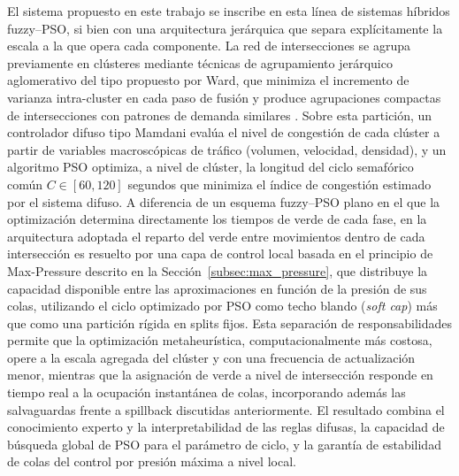 El sistema propuesto en este trabajo se inscribe en esta línea de sistemas híbridos fuzzy--PSO, si bien con una arquitectura jerárquica que separa explícitamente la escala a la que opera cada componente. La red de intersecciones se agrupa previamente en clústeres mediante técnicas de agrupamiento jerárquico aglomerativo del tipo propuesto por Ward, que minimiza el incremento de varianza intra-cluster en cada paso de fusión y produce agrupaciones compactas de intersecciones con patrones de demanda similares \cite{ward1963hierarchical}. Sobre esta partición, un controlador difuso tipo Mamdani evalúa el nivel de congestión de cada clúster a partir de variables macroscópicas de tráfico (volumen, velocidad, densidad), y un algoritmo PSO optimiza, a nivel de clúster, la longitud del ciclo semafórico común $C \in [60, 120]$ segundos que minimiza el índice de congestión estimado por el sistema difuso. A diferencia de un esquema fuzzy--PSO plano en el que la optimización determina directamente los tiempos de verde de cada fase, en la arquitectura adoptada el reparto del verde entre movimientos dentro de cada intersección es resuelto por una capa de control local basada en el principio de Max-Pressure descrito en la Sección~\ref{subsec:max_pressure}, que distribuye la capacidad disponible entre las aproximaciones en función de la presión de sus colas, utilizando el ciclo optimizado por PSO como techo blando (\emph{soft cap}) más que como una partición rígida en splits fijos. Esta separación de responsabilidades permite que la optimización metaheurística, computacionalmente más costosa, opere a la escala agregada del clúster y con una frecuencia de actualización menor, mientras que la asignación de verde a nivel de intersección responde en tiempo real a la ocupación instantánea de colas, incorporando además las salvaguardas frente a spillback discutidas anteriormente. El resultado combina el conocimiento experto y la interpretabilidad de las reglas difusas, la capacidad de búsqueda global de PSO para el parámetro de ciclo, y la garantía de estabilidad de colas del control por presión máxima a nivel local.

